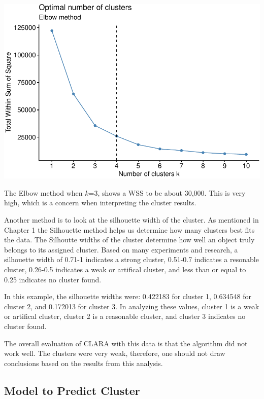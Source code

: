 \documentclass[12pt,twoside]{amherstthesis}
\begin{document}
  \begin{center}\includegraphics{Comps_Proj_files/figure-latex/unnamed-chunk-11-1} \end{center}
  
  The Elbow method when \(k\)=3, shows a WSS to be about 30,000. This is
  very high, which is a concern when interpreting the cluster results.
  
  Another method is to look at the silhouette width of the cluster. As
  mentioned in Chapter 1 the Silhouette method helps us determine how many
  clusters best fits the data. The Silhoutte widths of the cluster
  determine how well an object truly belongs to its assigned cluster.
  Based on many experiments and research, a silhouette width of 0.71-1
  indicates a strong cluster, 0.51-0.7 indicates a resonable cluster,
  0.26-0.5 indicates a weak or artifical cluster, and less than or equal
  to 0.25 indicates no cluster found.
  
  In this example, the silhouette widths were: 0.422183 for cluster 1,
  0.634548 for cluster 2, and 0.172013 for cluster 3. In analyzing these
  values, cluster 1 is a weak or artifical cluster, cluster 2 is a
  reasonable cluster, and cluster 3 indicates no cluster found.
  
  The overall evaluation of CLARA with this data is that the algorithm did
  not work well. The clusters were very weak, therefore, one should not
  draw conclusions based on the results from this analysis.
  
  \subsection{Model to Predict Cluster}\label{model-to-predict-cluster}
  
\end{document}
